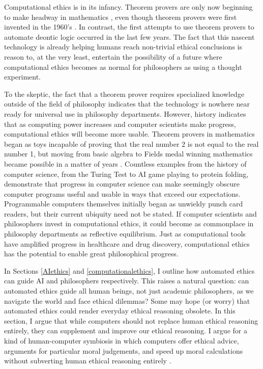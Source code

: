 \begin{isabellebody}
\begin{isamarkuptext}
Computational ethics is in its infancy. Theorem provers are only now beginning to make headway in 
mathematics \citep{buzzardvideo}, even though theorem provers were first invented in the 1960's \citep{historyofITP}. 
In contrast, the first attempts to use theorem provers to automate deontic logic occurred in the last
few years. The fact that this nascent technology is already helping humans reach non-trivial ethical conclusions 
is reason to, at the very least, entertain the possibility of a future where computational ethics 
becomes as normal for philosophers as using a thought experiment.

To the skeptic, the fact that a theorem prover requires specialized knowledge outside of the field 
of philosophy indicates that the technology is nowhere near ready for universal use in philosophy 
departments. However, history indicates that as computing power increases and computer scientists make 
progress, computational ethics will become more usable. Theorem provers in mathematics began as toys 
incapable of proving that the real number 2 is not equal to the real number 1, but 
moving from basic algebra to Fields medal winning mathematics became possible in a
matter of years \citep{buzzardvideo}. Countless examples from the history of computer science, from the Turing 
Test to AI game playing to protein folding, demonstrate that progress in computer science can make seemingly 
obscure computer programs useful and usable in ways that exceed our expectations.
Programmable computers themselves initially began as unwieldy punch card readers, but their current ubiquity 
need not be stated. If computer scientists and philosophers invest in computational ethics, it could
become as commonplace in philosophy departments as reflective equilibrium. Just as computational tools
have amplified progress in healthcare and drug discovery, computational ethics has the potential to enable
great philosophical progress.%
\end{isamarkuptext}\isamarkuptrue%
%
\isadelimdocument
%
\endisadelimdocument
%
\isatagdocument
%
\isamarkuptrue%
%
\endisatagdocument
{\isafolddocument}%
%
\isadelimdocument
%
\endisadelimdocument
%
\begin{isamarkuptext}%
In Sections \ref{AIethics} and \ref{computationalethics}, I outline how automated ethics can guide
AI and philosophers respectively. This raises a natural question: can automated
ethics guide all human beings, not just academic philosophers, as we navigate the world and face ethical
dilemmas? Some may hope (or worry) that automated ethics could render everyday ethical reasoning obsolete. In 
this section, I argue that while computers should not replace human ethical reasoning entirely,
they can supplement and improve our ethical reasoning. I argue for a kind of human-computer symbiosis
in which computers offer ethical advice, arguments for particular moral judgements, and speed up moral
calculations without subverting human ethical reasoning entirely \citep{licklider}.


\end{isamarkuptext}
\end{isabellebody}
